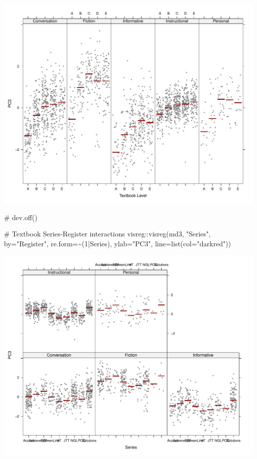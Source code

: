 \documentclass[
  letterpaper,
  DIV=11,
  numbers=noendperiod]{scrreprt}
\newenvironment{Shaded}{\begin{snugshade}}{\end{snugshade}}
\newcommand{\AttributeTok}[1]{\textcolor[rgb]{0.40,0.45,0.13}{#1}}
\newcommand{\CommentTok}[1]{\textcolor[rgb]{0.37,0.37,0.37}{#1}}
\newcommand{\DecValTok}[1]{\textcolor[rgb]{0.68,0.00,0.00}{#1}}
\newcommand{\FunctionTok}[1]{\textcolor[rgb]{0.28,0.35,0.67}{#1}}
\newcommand{\NormalTok}[1]{\textcolor[rgb]{0.00,0.23,0.31}{#1}}
\newcommand{\SpecialCharTok}[1]{\textcolor[rgb]{0.37,0.37,0.37}{#1}}
\newcommand{\StringTok}[1]{\textcolor[rgb]{0.13,0.47,0.30}{#1}}
\begin{document}
\includegraphics{E_Ch6_Analysis_files/figure-pdf/Dim3comparisons-1.pdf}

\begin{Shaded}
\begin{Highlighting}[]
\CommentTok{\# dev.off()}

\CommentTok{\# Textbook Series{-}Register interactions}
\NormalTok{visreg}\SpecialCharTok{::}\FunctionTok{visreg}\NormalTok{(md3, }\StringTok{"Series"}\NormalTok{, }\AttributeTok{by=}\StringTok{"Register"}\NormalTok{, }\AttributeTok{re.form=}\SpecialCharTok{\textasciitilde{}}\NormalTok{(}\DecValTok{1}\SpecialCharTok{|}\NormalTok{Series),}
               \AttributeTok{ylab=}\StringTok{"PC3"}\NormalTok{, }\AttributeTok{line=}\FunctionTok{list}\NormalTok{(}\AttributeTok{col=}\StringTok{"darkred"}\NormalTok{))}
\end{Highlighting}
\end{Shaded}

\includegraphics{E_Ch6_Analysis_files/figure-pdf/Dim3comparisons-2.pdf}
\end{document}
